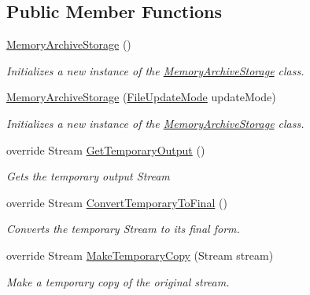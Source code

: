\subsection*{Public Member Functions}
\begin{DoxyCompactItemize}
\item 
\hyperlink{class_i_c_sharp_code_1_1_sharp_zip_lib_1_1_zip_1_1_memory_archive_storage_a892906b4098b358db3aca2d0b82da629}{Memory\+Archive\+Storage} ()
\begin{DoxyCompactList}\small\item\em Initializes a new instance of the \hyperlink{class_i_c_sharp_code_1_1_sharp_zip_lib_1_1_zip_1_1_memory_archive_storage}{Memory\+Archive\+Storage} class. \end{DoxyCompactList}\item 
\hyperlink{class_i_c_sharp_code_1_1_sharp_zip_lib_1_1_zip_1_1_memory_archive_storage_a996c164df05f96012f8387f1a0df3deb}{Memory\+Archive\+Storage} (\hyperlink{namespace_i_c_sharp_code_1_1_sharp_zip_lib_1_1_zip_a626313bc452203ca2bdb092947541027}{File\+Update\+Mode} update\+Mode)
\begin{DoxyCompactList}\small\item\em Initializes a new instance of the \hyperlink{class_i_c_sharp_code_1_1_sharp_zip_lib_1_1_zip_1_1_memory_archive_storage}{Memory\+Archive\+Storage} class. \end{DoxyCompactList}\item 
override Stream \hyperlink{class_i_c_sharp_code_1_1_sharp_zip_lib_1_1_zip_1_1_memory_archive_storage_a0cdd04c578ddab179ae057c4190cffd8}{Get\+Temporary\+Output} ()
\begin{DoxyCompactList}\small\item\em Gets the temporary output Stream \end{DoxyCompactList}\item 
override Stream \hyperlink{class_i_c_sharp_code_1_1_sharp_zip_lib_1_1_zip_1_1_memory_archive_storage_a15c32e570f6ac74b5909cae3e22d84f4}{Convert\+Temporary\+To\+Final} ()
\begin{DoxyCompactList}\small\item\em Converts the temporary Stream to its final form. \end{DoxyCompactList}\item 
override Stream \hyperlink{class_i_c_sharp_code_1_1_sharp_zip_lib_1_1_zip_1_1_memory_archive_storage_aba8d53a76aa47b36feefb4e42a98b4d3}{Make\+Temporary\+Copy} (Stream stream)
\begin{DoxyCompactList}\small\item\em Make a temporary copy of the original stream. \end{DoxyCompactList}\item 

\end{DoxyCompactItemize}
